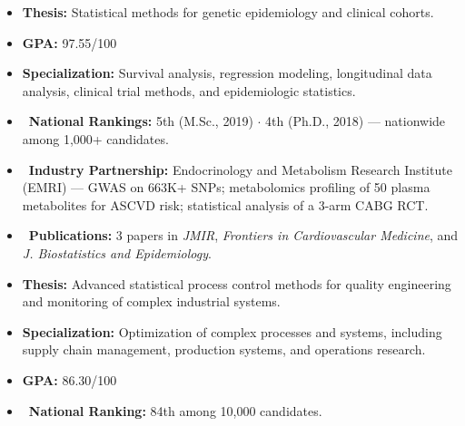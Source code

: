 \documentclass[10pt,a4paper,ragged2e]{altacv}
\begin{document}
\begin{itemize}
\item \textbf{Thesis:} Statistical methods for genetic epidemiology and clinical cohorts.
\item \textbf{GPA:} 97.55/100
\item \textbf{Specialization:} Survival analysis, regression modeling, longitudinal data analysis, clinical trial methods, and epidemiologic statistics.
\item[] \hspace*{-1.35\leftmargin} \textcolor{VividPurple}{\faStar\ \textbf{National Rankings:}} 5th (M.Sc., 2019) $\cdot$ 4th (Ph.D., 2018) --- nationwide among 1,000+ candidates.
\item[] \hspace*{-1.35\leftmargin} \textcolor{VividPurple}{\faInstitution\ \textbf{Industry Partnership:}} Endocrinology and Metabolism Research Institute (EMRI) --- GWAS on 663K+ SNPs; metabolomics profiling of 50 plasma metabolites for ASCVD risk; statistical analysis of a 3-arm CABG RCT.
\item[] \hspace*{-1.35\leftmargin} \textcolor{VividPurple}{\faBook\ \textbf{Publications:}} 3 papers in \textit{JMIR}, \textit{Frontiers in Cardiovascular Medicine}, and \textit{J. Biostatistics and Epidemiology}.
\end{itemize}

\vspace{-7pt}
\divider

\begin{itemize}
\item \textbf{Thesis:} Advanced statistical process control methods for quality engineering and monitoring of complex industrial systems.
\item \textbf{Specialization:} Optimization of complex processes and systems, including supply chain management, production systems, and operations research.
\item \textbf{GPA:} 86.30/100
\item[] \hspace*{-1.35\leftmargin} \textcolor{VividPurple}{\faStar\ \textbf{National Ranking:}} 84th among 10,000 candidates.
\end{itemize}
\end{document}
